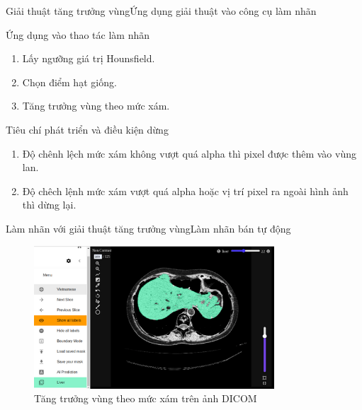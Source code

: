 \documentclass[
	10pt,                %
	aspectratio=169,     %
]{beamer}
\begin{document}
\begin{frame}{Giải thuật tăng trưởng vùng}{Ứng dụng giải thuật vào công cụ làm nhãn}
		\begin{block}{Ứng dụng vào thao tác làm nhãn}
			\begin{enumerate}
				\item Lấy ngưỡng giá trị Hounsfield. %
				\item Chọn điểm hạt giống.
				\item Tăng trưởng vùng theo mức xám. 
			\end{enumerate}
		\end{block}
		
		\begin{block}{Tiêu chí phát triển và điều kiện dừng}
		    \begin{enumerate}
				\item Độ chênh lệch mức xám không vượt quá alpha thì pixel được thêm vào vùng lan. 
				\item Độ chêch lệnh mức xám vượt quá alpha hoặc vị trí pixel ra ngoài hình ảnh thì dừng lại.
			\end{enumerate}
		\end{block}
		
\end{frame}

\begin{frame}{Làm nhãn với giải thuật tăng trưởng vùng}{Làm nhãn bán tự động}
		\begin{figure}[h!]
				\includegraphics[width=0.8\textwidth]{Presentation_template/figures/DAT/dat_ui_labeling_region_growing.png}
				\caption{Tăng trưởng vùng theo mức xám trên ảnh DICOM}
		\end{figure}
\end{frame}
\end{document}
